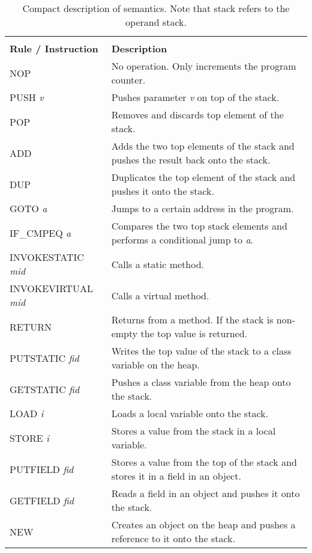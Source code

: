 \begin{table}[H]
\centering
\begin{tabular}{p{}|p{}}
\label{tab:instr}
 & \\
\textbf{Rule / Instruction}	  & \textbf{Description} \\ \hline
NOP             		  & No operation. Only increments the program counter. \\ \hline
PUSH \textit{v}           & Pushes parameter \textit{v} on top of the stack. \\ \hline
POP             		  & Removes and discards top element of the stack.\\ \hline
ADD             		  & Adds the two top elements of the stack and pushes the result back onto the stack.  \\ \hline
DUP             		  & Duplicates the top element of the stack and pushes it onto the stack. \\ \hline
GOTO \textit{a}           & Jumps to a certain address in the program.  \\ \hline
IF\_CMPEQ \textit{a}   	  & Compares the two top stack elements and performs a conditional jump to \textit{a}.  \\ \hline
INVOKESTATIC \textit{mid}    		  & Calls a static method.  \\ \hline
INVOKEVIRTUAL \textit{mid}		  & Calls a virtual method.  \\ \hline
RETURN                    & Returns from a method. If the stack is non-empty the top value is returned.   \\ \hline
PUTSTATIC \textit{fid}  & Writes the top value of the stack to a class variable on the heap.  \\ \hline
GETSTATIC \textit{fid}  & Pushes a class variable from the heap onto the stack. \\ \hline
LOAD \textit{i}           & Loads a local variable onto the stack.  \\ \hline
STORE \textit{i}          & Stores a value from the stack in a local variable.\\ \hline
PUTFIELD \textit{fid}   & Stores a value from the top of the stack and stores it in a field in an object.   \\ \hline
GETFIELD \textit{fid}	  & Reads a field in an object and pushes it onto the stack. \\ \hline
NEW   		              & Creates an object on the heap and pushes a reference to it onto the stack.  \\ \hline  
\end{tabular}
\caption{Compact description of \jcl  semantics. Note that stack refers to the operand stack.}
\end{table}

